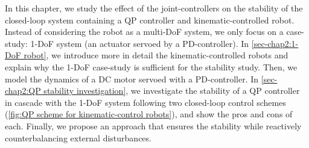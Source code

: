 In this chapter, we  study the effect of the joint-controllers on the stability of the closed-loop system containing a QP controller and kinematic-controlled robot. Instead of considering the robot as a multi-DoF system, we only focus on a case-study:  1-DoF  system (an actuator servoed by a PD-controller). In \cref{sec-chap2:1-DoF robot}, we  introduce more in detail the kinematic-controlled robots and explain why the 1-DoF case-study is sufficient for the stability study. Then, we  model the dynamics of a DC motor servoed with a PD-controller. In \cref{sec-chap2:QP stability investigation}, we investigate the stability of a QP controller in cascade with the 1-DoF system following two closed-loop control schemes (\cref{fig:QP scheme for kinematic-control robots}), and show the pros and cons of each. Finally, we propose an approach that ensures the stability while reactively counterbalancing external disturbances.    




